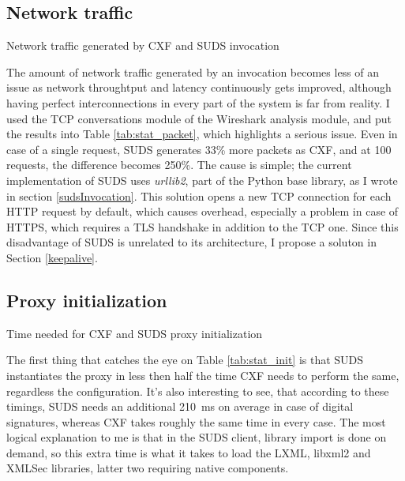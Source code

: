 \subsection{Network traffic}
\label{traffic}

\begin{table}[htbp]
 \begin{center}
  
  \caption{Network traffic generated by CXF and SUDS invocation}
  \label{tab:stat_packet}
 \end{center}
\end{table}

\noindent
The amount of network traffic generated by an invocation becomes less of an issue as network throughtput and latency continuously gets improved, although having perfect interconnections in every part of the system is far from reality. I used the TCP conversations module of the Wireshark analysis module, and put the results into Table \ref{tab:stat_packet}, which highlights a serious issue. Even in case of a single request, SUDS generates 33\% more packets as CXF, and at 100 requests, the difference becomes 250\%. The cause is simple; the current implementation of SUDS uses \emph{urllib2}, part of the Python base library, as I wrote in section \ref{sudsInvocation}. This solution opens a new TCP connection for each HTTP request by default, which causes overhead, especially a problem in case of HTTPS, which requires a TLS handshake in addition to the TCP one. Since this disadvantage of SUDS is unrelated to its architecture, I propose a soluton in Section \ref{keepalive}.

\subsection{Proxy initialization}

\begin{table}[htbp]
 \begin{center}
  
  \caption{Time needed for CXF and SUDS proxy initialization}
  \label{tab:stat_init}
 \end{center}
\end{table}

\noindent
The first thing that catches the eye on Table \ref{tab:stat_init} is that SUDS instantiates the proxy in less then half the time CXF needs to perform the same, regardless the configuration. It's also interesting to see, that according to these timings, SUDS needs an additional \mbox{210 ms} on average in case of digital signatures, whereas CXF takes roughly the same time in every case. The most logical explanation to me is that in the SUDS client, library import is done on demand, so this extra time is what it takes to load the LXML, libxml2 and XMLSec libraries, latter two requiring native components.

